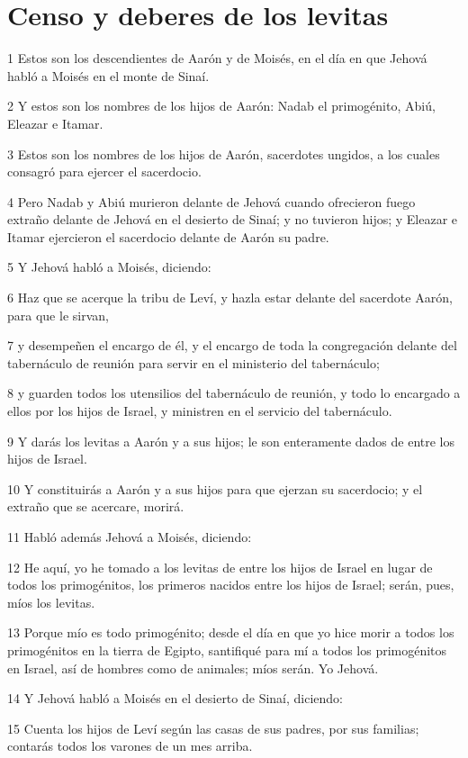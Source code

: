 \section*{Censo y deberes de los levitas}

\par 1 Estos son los descendientes de Aarón y de Moisés, en el día en que Jehová habló a Moisés en el monte de Sinaí.
\par 2 Y estos son los nombres de los hijos de Aarón: Nadab el primogénito, Abiú, Eleazar e Itamar. 
\par 3 Estos son los nombres de los hijos de Aarón, sacerdotes ungidos, a los cuales consagró para ejercer el sacerdocio. 
\par 4 Pero Nadab y Abiú murieron delante de Jehová cuando ofrecieron fuego extraño delante de Jehová en el desierto de Sinaí; y no tuvieron hijos; y Eleazar e Itamar ejercieron el sacerdocio delante de Aarón su padre.
\par 5 Y Jehová habló a Moisés, diciendo:
\par 6 Haz que se acerque la tribu de Leví, y hazla estar delante del sacerdote Aarón, para que le sirvan,
\par 7 y desempeñen el encargo de él, y el encargo de toda la congregación delante del tabernáculo de reunión para servir en el ministerio del tabernáculo;
\par 8 y guarden todos los utensilios del tabernáculo de reunión, y todo lo encargado a ellos por los hijos de Israel, y ministren en el servicio del tabernáculo.
\par 9 Y darás los levitas a Aarón y a sus hijos; le son enteramente dados de entre los hijos de Israel.
\par 10 Y constituirás a Aarón y a sus hijos para que ejerzan su sacerdocio; y el extraño que se acercare, morirá.
\par 11 Habló además Jehová a Moisés, diciendo:
\par 12 He aquí, yo he tomado a los levitas de entre los hijos de Israel en lugar de todos los primogénitos, los primeros nacidos entre los hijos de Israel; serán, pues, míos los levitas.
\par 13 Porque mío es todo primogénito; desde el día en que yo hice morir a todos los primogénitos en la tierra de Egipto, santifiqué para mí a todos los primogénitos en Israel, así de hombres como de animales; míos serán. Yo Jehová.
\par 14 Y Jehová habló a Moisés en el desierto de Sinaí, diciendo:
\par 15 Cuenta los hijos de Leví según las casas de sus padres, por sus familias; contarás todos los varones de un mes arriba.
